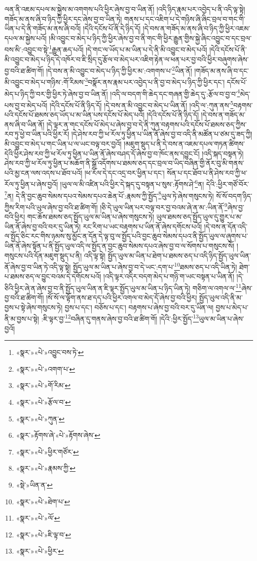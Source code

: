 ལན་ནི་འཇམ་དཔལ་མ་སྐྱེས་མ་འགགས་པའི་ཕྱིར་ཞེས་བྱ་བ་ཡིན་ནོ། །འདི་ཉིད་རྣམ་པར་འབྱེད་པ་ནི་འདི་ལྟ་སྟེ། གཟོད་མ་ནས་ཞི་བ་ཉིད་ཀྱི་ཕྱིར་དང་ཞེས་བྱ་བ་ཡིན་ཏེ། གནས་པ་དང་འཇིག་པ་དེ་གཉིས་ཞི་ཞིང་བྲལ་བ་གང་གི་ཡིན་པ་དེ་ནི་གཟོད་མ་ནས་ཞི་བའོ། །དེའི་དངོས་པོ་ནི་དེ་ཉིད་དོ། །དེ་བས་ན་གཟོད་མ་ནས་ཞི་བ་ཉིད་ཀྱི་ཕྱིར་འཇམ་དཔལ་མ་སྐྱེས་པའོ། །མི་འབྱུང་བ་མེད་པ་ཉིད་ཀྱི་ཕྱིར་ཞེས་བྱ་བ་ནི་གང་གི་ཕྱིར་རྒྱུན་གྱིས་སྐྱེ་ཞིང་འབྱུང་བ་དང་བྲལ་བས་མི་:འབྱུང་བ་སྟེ་\footnote{«སྣར་»«པེ་»འབྱུང་བས་ཏེ་}རྒྱུན་ཆད་པའོ། །དེ་གང་ལ་ཡོད་པ་མ་ཡིན་པ་དེ་ནི་མི་འབྱུང་བ་མེད་པའོ། །དེའི་དངོས་པོ་ནི་མི་འབྱུང་བ་མེད་པ་ཉིད་དེ་འཁོར་བ་ཇི་སྲིད་དུ་རྩོལ་བ་མེད་པར་འཇིག་རྟེན་ལ་ཕན་པར་བྱ་བའི་ཕྱིར་བཞུགས་ཞེས་བྱ་བའི་ཐ་ཚིག་གོ། །དེ་བས་ན་མི་འབྱུང་བ་མེད་པ་ཉིད་ཀྱི་ཕྱིར་མ་:འགགས་པ་\footnote{«སྣར་»«པེ་»འགག་པ་}ཡིན་ནོ། །གཟོད་མ་ནས་ཞི་བ་དང་མི་འབྱུང་བ་མེད་པ་གཉིས་:གོ་རིམས་\footnote{«སྣར་»«པེ་»གོ་རིམ་}བསྣོར་ནས་རྣམ་པར་འབྱེད་པ་ནི་བྱ་བ་མེད་པ་ཉིད་ཀྱི་ཕྱིར་དང་། དངོས་པོ་མེད་པ་ཉིད་ཀྱི་བར་གྱི་ཕྱིར་ཏེ་ཞེས་བྱ་བ་ཡིན་ནོ། །འདི་ལ་བདག་གི་ཆེད་དང་གཞན་གྱི་ཆེད་དུ་:རྩོལ་བ་བྱ་བ་\footnote{«སྣར་»«པེ་»རྩོལ་བ་}མེད་པས་བྱ་བ་མེད་པའོ། །དེའི་དངོས་པོ་ནི་ཉིད་དོ། །དེ་བས་ན་མི་འབྱུང་བ་མེད་པ་ཡིན་ནོ། །འདི་ལ་:ཀུན་ནས་\footnote{«སྣར་»«པེ་»ཀུན་}བརྟགས་པའི་དངོས་པོ་ཐམས་ཅད་ཡོད་པ་མ་ཡིན་པས་དངོས་པོ་མེད་པའོ། །དེའི་དངོས་པོ་ནི་ཉིད་དོ། །དེ་བས་ན་གཟོད་མ་ནས་ཞི་བ་ཡིན་ནོ། །དེ་ལྟར་ན་གང་དངོས་པོ་མེད་པ་ཞེས་བྱ་བ་དེ་ནི་ཀུན་བརྟགས་པའི་དངོས་པོ་ཐམས་ཅད་ཀྱིས་རབ་ཏུ་ཕྱེ་བ་ཡིན་པའི་ཕྱིར་རོ། །དེ་ཤེས་རབ་ཀྱི་ཕ་རོལ་ཏུ་ཕྱིན་པ་ཡིན་ནོ་ཞེས་བྱ་བ་འདི་ནི་མཚོན་པ་ཙམ་དུ་ཟད་ཀྱི། མི་འབྱུང་བ་མེད་པ་གང་ཡིན་པ་ལ་ཡང་བལྟ་བར་བྱའོ། །མཇུག་སྡུད་པ་ནི་དེ་བས་ན་འཇམ་དཔལ་གཏན་ཚིགས་དེའི་ཕྱིར་ཤེས་རབ་ཀྱི་ཕ་རོལ་ཏུ་ཕྱིན་པ་ཡིན་ནོ་ཞེས་བཤད་དོ་ཞེས་བྱ་བ་ཁོང་ནས་དབྱུང་ངོ། །འདི་སྐད་བསྟན་ཏེ། ཤེས་རབ་ཀྱི་ཕ་རོལ་ཏུ་ཕྱིན་པ་མཆོག་ནི་སྒྲོ་འདོགས་པ་ཐམས་ཅད་དང་བྲལ་བ་ཡིད་བཞིན་གྱི་ནོར་བུ་མི་གནས་པའི་མྱ་ངན་ལས་འདས་པ་ཐོབ་པའོ། །ཕ་རོལ་དེ་དང་འདྲ་བར་ཕྱིན་པ་དང་། སོན་པ་དང་ཐོབ་པ་ནི་ཤེས་རབ་ཀྱི་ཕ་རོལ་ཏུ་ཕྱིན་པ་ཞེས་བྱའོ། །ཡུལ་ལ་མི་འཛིན་པའི་ཕྱིར་དེ་སྐད་དུ་བསྟན་པ་སུས་:རྟོགས་ཤེ་\footnote{«སྣར་»རྟོགས་ཞེ་«པེ་»རྟོགས་ཞེས་}ན། དེའི་:ཕྱིར་གཙོ་བོར་\footnote{«སྣར་»«པེ་»ཕྱིར་གཙོར་}ན། དེ་ནི་བྱང་ཆུབ་སེམས་དཔའ་སེམས་དཔའ་ཆེན་པོ་:རྣམས་ཀྱི་སྤྱོད་\footnote{«སྣར་»«པེ་»རྣམས་ཀྱི་}ཡུལ་ཏེ་ཞེས་གསུངས་ཏེ། སོ་སོ་བདག་ཉིད་ཀྱིས་རིག་པའི་ཡུལ་ཞེས་བྱ་བའི་ཐ་ཚིག་གོ། །ཅི་དེ་ཡུལ་ཡིན་པར་བལྟ་བར་བྱ་བའམ་ཞེ་ན་མ་:ཡིན་ནོ་\footnote{«སྡེ་»ཡིན་ན་}ཞེས་བྱ་བའི་ཕྱིར། གང་ཆོས་ཐམས་ཅད་སྤྱོད་ཡུལ་མ་ཡིན་པ་ཞེས་གསུངས་ཏེ། ཡུལ་ཐམས་ཅད་སྤྱོད་ཡུལ་དུ་གྱུར་པ་མ་ཡིན་ནོ་ཞེས་བྱ་བའི་བར་དུ་ཡིན་ཏེ། རང་རིག་པ་ཡང་བརྟགས་པ་ཡིན་ནོ་ཞེས་དགོངས་པའོ། །དེ་བས་ན་དོན་འདི་ལ་སྤྱོད་ཅིང་རང་གིས་ཉམས་སུ་མྱོང་ན་དོན་དེ་ལྟ་བུ་ལ་སྤྱོད་པའི་བྱང་ཆུབ་སེམས་དཔའ་ནི་སྤྱོད་ཡུལ་ལ་ཞུགས་པ་ཡིན་ནོ་ཞེས་སྟོན་པ་ནི་སྤྱོད་ཡུལ་འདི་ལ་སྤྱོད་ན་བྱང་ཆུབ་སེམས་དཔའ་ཞེས་བྱ་བ་ལ་སོགས་པ་གསུངས་སོ། །གསུངས་པའི་དོན་མཇུག་སྡུད་པ་ནི། འདི་ལྟ་སྟེ། སྤྱོད་ཡུལ་མ་ཡིན་པ་ཐེག་པ་ཐམས་ཅད་པ་འདི་ཉིད་སྤྱོད་ཡུལ་ཡིན་ནོ་ཞེས་བྱ་བ་ཡིན་ཏེ་འདི་ལྟ་སྟེ། སྤྱོད་ཡུལ་མ་ཡིན་པ་ཞེས་བྱ་བ་དེ་ཡང་:དག་པ་\footnote{«སྣར་»«པེ་»ཐེག་པ་}ཐམས་ཅད་པ་འདི་ཡིན་ཏེ། ཐེག་པ་ཐམས་ཅད་ལ་བྱུང་བའམ་དེ་དགོངས་པའོ། །འདི་ལྟར་འདིར་བདག་མེད་པ་གཉི་ག་ཡང་བསྟན་པ་ཡིན་ནོ། །དེ་ཅིའི་ཕྱིར་ཞེ་ན་ཞེས་བྱ་བ་ནི་སྤྱོད་ཡུལ་ཡིན་ན་ཇི་ལྟར་སྤྱོད་ཡུལ་མ་ཡིན་པ་ཉིད་ཡིན་ཏེ། གཅིག་ལ་འགལ་ལ་\footnote{«སྣར་»«པེ་»ལོ་}ཞེས་བྱ་བའི་ཐ་ཚིག་གོ། །སོ་སོ་ལ་ལྟོག་ནས་ཐ་དད་པའི་ཕྱིར་འགལ་བ་མེད་དོ་ཞེས་བྱ་བའི་ཕྱིར། སྤྱོད་ཡུལ་འདི་ནི་མ་བྱས་པ་སྟེ་ཞེས་གསུངས་ཏེ། བྱས་པ་དང་། བཅོས་པ་དང་། བརྟགས་པ་ཞེས་བྱ་བའི་བར་དུ་ཡིན་ལ། བྱས་པ་མེད་པ་ནི་མ་བྱས་པ་སྟེ། :ཇི་ལྟར་བྱ་\footnote{«སྣར་»«པེ་»ཇི་ལྟ་བ་}བཞིན་དུ་གནས་ཞེས་བྱ་བའི་ཐ་ཚིག་གོ། །དེའི་:ཕྱིར་སྤྱོད་\footnote{«སྣར་»«པེ་»ཕྱིར་}ཡུལ་མ་ཡིན་པ་ཞེས་བྱའོ། 